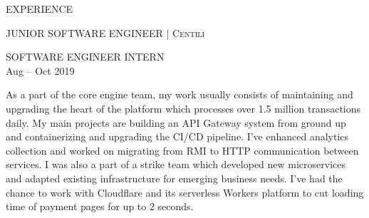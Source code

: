 \begin{minipage}[t]{\linewidth}\vspace{\sectionTopmargin}
{\titleFont\light EXPERIENCE}\linebreak

\vspace{\titleBottomMargin}
{\subtitleFont\bold JUNIOR SOFTWARE ENGINEER \extraLight\scshape | Centili}\newline
\vfill\vspace{\dateTopMargin}{\dateFont\extraLight Oct 2019 -- present\alignRight}\linebreak\newline

\vspace{\twoColMiniSubtitleTopMargin}
\begin{minipage}[t]{0.99\linewidth}
{\miniSubtitleFont\bold SOFTWARE ENGINEER INTERN\\\miniDateFont\extraLight Aug -- Oct 2019 }
\end{minipage}
\newline

\vspace{\contentTopMarginAlt} %
{\contentFont As a part of the core engine team, my work usually consists of maintaining and upgrading the heart of the platform which processes over 1.5 million transactions daily. My main projects are building an API Gateway system from ground up and containerizing and upgrading the CI/CD pipeline. I've enhanced analytics collection and worked on migrating from RMI to HTTP communication between services. I was also a part of a strike team which developed new microservices and adapted existing infrastructure for emerging business needs. I've had the chance to work with Cloudflare and its serverless Workers platform to cut loading time of payment pages for up to 2 seconds.}
\end{minipage}\newline%
